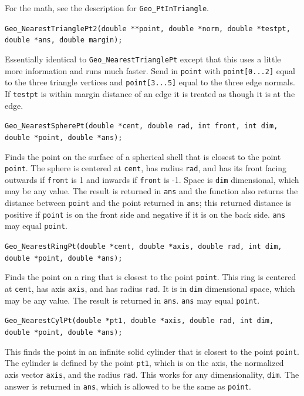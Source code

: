 \documentclass[11pt]{article}
\newcommand {\ttt} {\texttt}
\begin{document}
\begin{description}
For the math, see the description for \ttt{Geo\_PtInTriangle}.

\item[\ttt{int}]
\ttt{Geo\_NearestTrianglePt2(double **point, double *norm, double *testpt, double *ans, double margin);}

Essentially identical to \ttt{Geo\_NearestTrianglePt} except that this uses a little more information and runs much faster. Send in \ttt{point} with \ttt{point[0...2]} equal to the three triangle vertices and \ttt{point[3...5]} equal to the three edge normals. If \ttt{testpt} is within margin distance of an edge it is treated as though it is at the edge.

\item[\ttt{double}]
\ttt{Geo\_NearestSpherePt(double *cent, double rad, int front, int dim, double *point, double *ans);}

Finds the point on the surface of a spherical shell that is closest to the point \ttt{point}. The sphere is centered at \ttt{cent}, has radius \ttt{rad}, and has its front facing outwards if \ttt{front} is 1 and inwards if \ttt{front} is -1. Space is \ttt{dim} dimensional, which may be any value. The result is returned in \ttt{ans} and the function also returns the distance between \ttt{point} and the point returned in \ttt{ans}; this returned distance is positive if \ttt{point} is on the front side and negative if it is on the back side. \ttt{ans} may equal \ttt{point}.

\item[\ttt{void}]
\ttt{Geo\_NearestRingPt(double *cent, double *axis, double rad, int dim, double *point, double *ans);}

Finds the point on a ring that is closest to the point \ttt{point}. This ring is centered at \ttt{cent}, has axis \ttt{axis}, and has radius \ttt{rad}. It is in \ttt{dim} dimensional space, which may be any value. The result is returned in \ttt{ans}. \ttt{ans} may equal \ttt{point}.

\item[\ttt{void}]
\ttt{Geo\_NearestCylPt(double *pt1, double *axis, double rad, int dim, double *point, double *ans);}

This finds the point in an infinite solid cylinder that is closest to the point \ttt{point}. The cylinder is defined by the point \ttt{pt1}, which is on the axis, the normalized axis vector \ttt{axis}, and the radius \ttt{rad}. This works for any dimensionality, \ttt{dim}. The answer is returned in \ttt{ans}, which is allowed to be the same as \ttt{point}.


\end{description}
\end{document}
